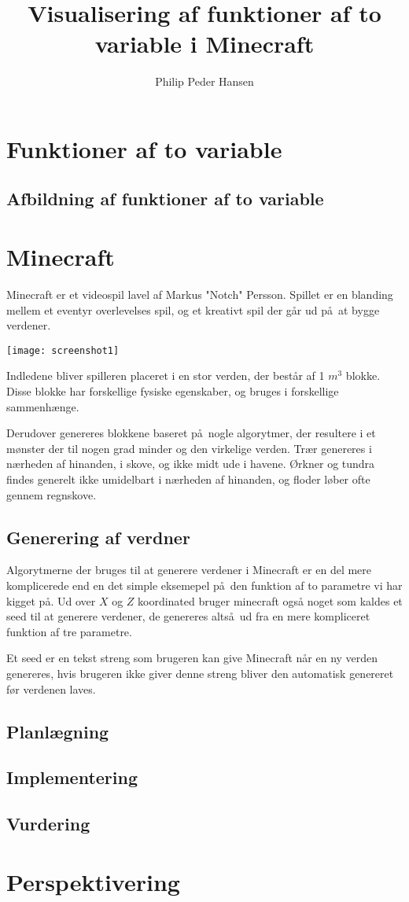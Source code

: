 \documentclass[a4paper,12pt]{report}
\author{Philip Peder Hansen}
\title{Visualisering af funktioner af to variable i Minecraft}
\begin{document}
	\maketitle
	\tableofcontents
	\clearpage
	\section{Funktioner af to variable}
	\subsection{Afbildning af funktioner af to variable}
	\section{Minecraft}
		Minecraft er et videospil lavel af Markus "Notch" Persson.
		Spillet er en blanding mellem et eventyr overlevelses spil, og et kreativt spil der g\aa r ud p\aa \ at bygge verdener.

		\vspace{5 mm}
		\texttt{[image: screenshot1]}
		\vspace{5 mm}

		Indledene bliver spilleren placeret i en stor verden, der best\aa r af 1 $m^3$ blokke. Disse blokke har forskellige fysiske egenskaber,
		og bruges i forskellige sammenh\ae nge.

		Derudover genereres blokkene baseret p\aa \ nogle algorytmer, der resultere i et m\o nster der til nogen grad minder
		og den virkelige verden. Tr\ae r genereres i n\ae rheden af hinanden, i skove, og ikke midt ude i havene.
		\O rkner og tundra findes generelt ikke umidelbart i n\ae rheden af hinanden, og floder l\o ber ofte gennem regnskove. 
	\subsection{Generering af verdner}
		Algorytmerne der bruges til at generere verdener i Minecraft er en del mere komplicerede end en det simple eksemepel p\aa \ den funktion
		af to parametre vi har kigget p\aa . Ud over $X$ og $Z$ koordinated bruger minecraft også noget som kaldes et seed til at generere
		verdener, de genereres alts\aa \ ud fra en mere kompliceret funktion af tre parametre.

		Et seed er en tekst streng som brugeren kan give Minecraft n\aa r en ny verden genereres, hvis brugeren ikke giver denne streng
		bliver den automatisk genereret f\o r verdenen laves.
	\subsection{Planlægning}
	\subsection{Implementering}
	\subsection{Vurdering}
	\section{Perspektivering}
\end{document}
